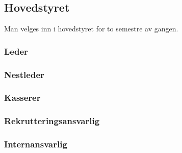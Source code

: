 \documentclass[10pt,norsk,a4paper,usenames,dvipsnames]{article}
\begin{document}
    
\begin{minipage}[t]{0.5\textwidth}
    \subsection{Hovedstyret}
        Man velges inn i hovedstyret for to semestre av gangen.

        \subsubsection{Leder}
        
        
        \subsubsection{Nestleder}
        
        
        \subsubsection{Kasserer}
    
    
        \subsubsection{Rekrutteringsansvarlig}

        
        \subsubsection{Internansvarlig}
        
\end{minipage}
\end{document}
